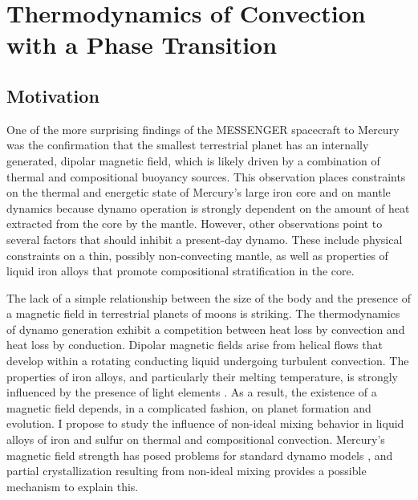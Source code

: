 \chapter{Thermodynamics of Convection with a Phase Transition}\label{chap3}


\section{Motivation}

One of the more surprising findings of the MESSENGER spacecraft to Mercury was
the confirmation that the smallest terrestrial planet has an internally
generated, dipolar magnetic field, which is likely driven by a combination of
thermal and compositional buoyancy sources. This observation places constraints
on the thermal and energetic state of Mercury’s large iron core and on mantle
dynamics because dynamo operation is strongly dependent on the amount of heat
extracted from the core by the mantle. However, other observations point to
several factors that should inhibit a present-day dynamo. These include
physical constraints on a thin, possibly non-convecting mantle, as well as
properties of liquid iron alloys that promote compositional stratification in
the core.

The lack of a simple relationship between the size of the body and the presence
of a magnetic field in terrestrial planets of moons is striking. The
thermodynamics of dynamo generation exhibit a competition between heat loss by
convection and heat loss by conduction.  Dipolar magnetic fields arise from
helical flows that develop within a rotating conducting liquid undergoing
turbulent convection. The properties of iron alloys, and particularly their
melting temperature, is strongly influenced by the presence of light elements
\citep{sanloup2000}. As a result, the existence of a magnetic field depends, in a
complicated fashion, on planet formation and evolution. I propose to study the
influence of non-ideal mixing behavior in liquid alloys of iron and sulfur on
thermal and compositional convection. Mercury's magnetic field strength has
posed problems for standard dynamo models \citep{Christensen2006,Stanley2005}, and
partial crystallization resulting from non-ideal mixing provides a possible
mechanism to explain this.

